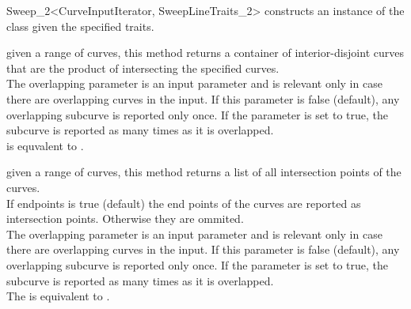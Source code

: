 \begin{ccRefClass}{Sweep_2<CurveInputIterator, SweepLineTraits_2>}
   {constructs an instance of the  class given the specified traits.}
    

\ccTypes
{}

\ccQueryFunctions

{given a range of curves, this method returns a container of 
interior-disjoint curves that are the product of intersecting 
the specified curves. 
\\The overlapping parameter is an input parameter and is relevant 
only in case there are overlapping curves in the input. If this parameter 
is false (default), any overlapping subcurve is reported only once. If the 
parameter is set to true, the subcurve is reported as many times as it 
is overlapped.
\\ is equvalent to 
.}

{given a range of curves, this method returns a list of all intersection
points of the curves. 
\\If endpoints is true (default) the end points
of the curves are reported as intersection points. Otherwise they are 
ommited. 
\\The overlapping parameter is an input parameter and is relevant 
only in case there are overlapping curves in the input. If this parameter 
is false (default), any overlapping subcurve is reported only once. If the 
parameter is set to true, the subcurve is reported as many times as it 
is overlapped.
\\The {} is equivalent to
.}



\end{ccRefClass}
